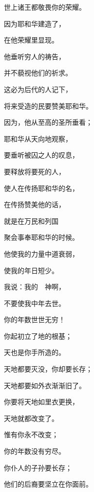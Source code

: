 {\par }{\Q 世上诸王都敬畏你的荣耀。
\par }{\Q {}因为耶和华建造了{}，
\par }{\Q 在他荣耀里显现。
\par }{\Q {}他垂听穷人的祷告，
\par }{\Q 并不藐视他们的祈求。
\par }{\BB \par }{\Q {}这必为后代的人记下，
\par }{\Q 将来受造的民要赞美耶和华。
\par }{\Q {}因为，他从至高的圣所垂看；
\par }{\Q 耶和华从天向地观察，
\par }{\Q {}要垂听被囚之人的叹息，
\par }{\Q 要释放将要死的人，
\par }{\Q {}使人在{}传扬耶和华的名，
\par }{\Q 在{}传扬赞美他的话，
\par }{\Q {}就是在万民和列国
\par }{\Q 聚会事奉耶和华的时候。
\par }{\BB \par }{\Q {}他使我的力量中道衰弱，
\par }{\Q 使我的年日短少。
\par }{\Q {}我说：我的　神啊，
\par }{\Q 不要使我中年去世。
\par }{\Q 你的年数世世无穷！
\par }{\BB \par }{\Q {}你起初立了地的根基；
\par }{\Q 天也是你手所造的。
\par }{\Q {}天地都要灭没，你却要长存；
\par }{\Q 天地都要如外衣渐渐旧了。
\par }{\Q 你要将天地如里衣更换，
\par }{\Q 天地就都改变了。
\par }{\Q {}惟有你永不改变；
\par }{\Q 你的年数没有穷尽。
\par }{\Q {}你仆人的子孙要长存；
\par }{\Q 他们的后裔要坚立在你面前。

}
